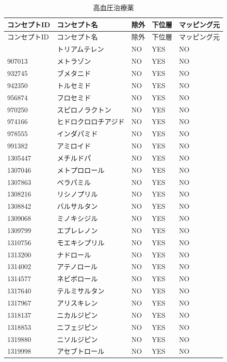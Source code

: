 \documentclass[
  11pt]{book}
\theoremstyle{definition}
\theoremstyle{definition}
\theoremstyle{definition}
\theoremstyle{definition}
\theoremstyle{remark}
\begin{document}
\begin{longtable}[]{@{}lllll@{}}
\caption{\label{tab:HTN1yrFODrugs} 高血圧治療薬}\tabularnewline
\toprule\noalign{}
コンセプトID & コンセプト名 & 除外 & 下位層 & マッピング元 \\
\midrule\noalign{}
\endfirsthead
\toprule\noalign{}
コンセプトID & コンセプト名 & 除外 & 下位層 & マッピング元 \\
\midrule\noalign{}
\endhead
\bottomrule\noalign{}
\endlastfoot
904542 & トリアムテレン & NO & YES & NO \\
907013 & メトラゾン & NO & YES & NO \\
932745 & ブメタニド & NO & YES & NO \\
942350 & トルセミド & NO & YES & NO \\
956874 & フロセミド & NO & YES & NO \\
970250 & スピロノラクトン & NO & YES & NO \\
974166 & ヒドロクロロチアジド & NO & YES & NO \\
978555 & インダパミド & NO & YES & NO \\
991382 & アミロイド & NO & YES & NO \\
1305447 & メチルドパ & NO & YES & NO \\
1307046 & メトプロロール & NO & YES & NO \\
1307863 & ベラパミル & NO & YES & NO \\
1308216 & リシノプリル & NO & YES & NO \\
1308842 & バルサルタン & NO & YES & NO \\
1309068 & ミノキシジル & NO & YES & NO \\
1309799 & エプレレノン & NO & YES & NO \\
1310756 & モエキシプリル & NO & YES & NO \\
1313200 & ナドロール & NO & YES & NO \\
1314002 & アテノロール & NO & YES & NO \\
1314577 & ネビボロール & NO & YES & NO \\
1317640 & テルミサルタン & NO & YES & NO \\
1317967 & アリスキレン & NO & YES & NO \\
1318137 & ニカルジピン & NO & YES & NO \\
1318853 & ニフェジピン & NO & YES & NO \\
1319880 & ニソルジピン & NO & YES & NO \\
1319998 & アセブトロール & NO & YES & NO \\

\end{longtable}
\end{document}
